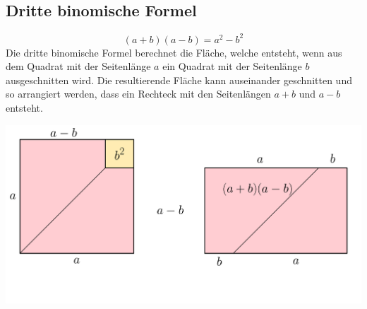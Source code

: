 \subsection{Dritte binomische Formel}
\[
  (a+b)(a-b) = a^{2} - b^{2}
\]
Die dritte binomische Formel berechnet die Fläche, welche entsteht, wenn aus dem Quadrat mit der Seitenlänge $a$ ein Quadrat mit der Seitenlänge $b$ ausgeschnitten wird. Die resultierende Fläche kann auseinander geschnitten und so arrangiert werden, dass ein Rechteck mit den Seitenlängen $a+b$ und $a-b$ entsteht.
\begin{center}
  \includegraphics[width=.8\textwidth]{Binomische Formel 3.pdf}
\end{center}
